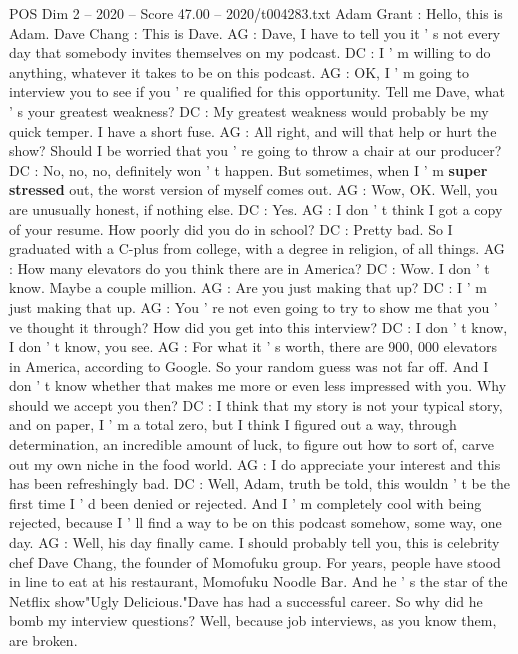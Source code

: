\begin{textsample}{POS Dim 2 – 2020 – Score 47.00 – 2020/t004283.txt}  \label{ex:f2_pos_004}
Adam Grant : Hello, this is Adam.
Dave Chang : This is Dave.
AG : Dave, I have to tell you it ' s not every day that somebody invites themselves on my podcast.
DC : I ' m willing to do anything, whatever it takes to be on this podcast.
AG : OK, I ' m going to interview you to see if you ' re qualified for this opportunity.
Tell me Dave, what ' s your greatest weakness?
DC : My greatest weakness would probably be my quick temper.
I have a short fuse.
AG : All right, and will that help or hurt the show?
Should I be worried that you ' re going to throw a chair at our producer?
DC : No, no, no, definitely won ' t happen.
But sometimes, when I ' m \textbf{super} \textbf{stressed} out, the worst version of myself comes out.
AG : Wow, OK.
Well, you are unusually honest, if nothing else.
DC : Yes.
AG : I don ' t think I got a copy of your resume.
How poorly did you do in school?
DC : Pretty bad.
So I graduated with a C-plus from college, with a degree in religion, of all things.
AG : How many elevators do you think there are in America?
DC : Wow.
I don ' t know.
Maybe a couple million.
AG : Are you just making that up?
DC : I ' m just making that up.
AG : You ' re not even going to try to show me that you ' ve thought it through?
How did you get into this interview?
DC : I don ' t know, I don ' t know, you see.
AG : For what it ' s worth, there are 900, 000 elevators in America, according to Google.
So your random guess was not far off.
And I don ' t know whether that makes me more or even less impressed with you.
Why should we accept you then?
DC : I think that my story is not your typical story, and on paper, I ' m a total zero, but I think I figured out a way, through determination, an incredible amount of luck, to figure out how to sort of, carve out my own niche in the food world.
AG : I do appreciate your interest and this has been refreshingly bad.
DC : Well, Adam, truth be told, this wouldn ' t be the first time I ' d been denied or rejected.
And I ' m completely cool with being rejected, because I ' ll find a way to be on this podcast somehow, some way, one day.
AG : Well, his day finally came.
I should probably tell you, this is celebrity chef Dave Chang, the founder of Momofuku group.
For years, people have stood in line to eat at his restaurant, Momofuku Noodle Bar.
And he ' s the star of the Netflix show"Ugly Delicious."Dave has had a successful career.
So why did he bomb my interview questions?
Well, because job interviews, as you know them, are broken.

\end{textsample}
